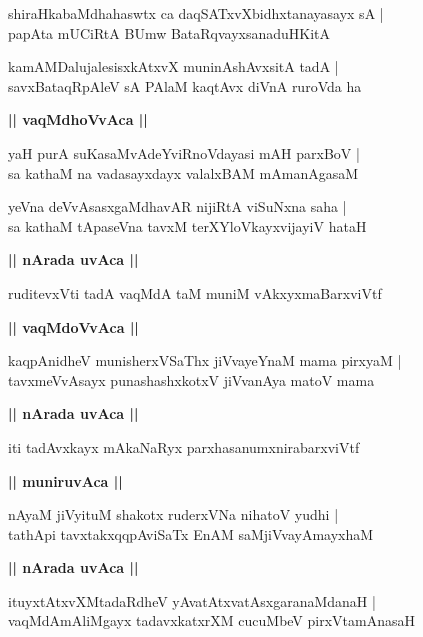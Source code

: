 \documentclass[twoside,12pt,openright]{book}
\newcounter{shloka}[chapter]
\def\uvaca#1{\centerline{{\large\textbf{#1}}}}
\begin{document}
\begin{shloka}%
shiraHkabaMdhahaswtx ca daqSATxvXbidhxtanayasayx sA |\\
papAta mUCiRtA BUmw BataRqvayxsanaduHKitA 
\end{shloka}

\begin{shloka}%
kamAMDalujalesisxkAtxvX muninAshAvxsitA tadA |\\
savxBataqRpAleV sA PAlaM kaqtAvx diVnA ruroVda ha 
\end{shloka}

\uvaca{|| vaqMdhoVvAca ||}

\begin{shloka}%
yaH purA suKasaMvAdeYviRnoVdayasi mAH parxBoV |\\
sa kathaM na vadasayxdayx valalxBAM mAmanAgasaM 
\end{shloka}

\begin{shloka}%
yeVna deVvAsasxgaMdhavAR nijiRtA viSuNxna saha |\\
sa kathaM tApaseVna tavxM terXYloVkayxvijayiV hataH 
\end{shloka}

\uvaca{|| nArada uvAca ||}

\begin{shloka}%
ruditevxVti tadA vaqMdA taM muniM vAkxyxmaBarxviVtf 
\end{shloka}

\uvaca{|| vaqMdoVvAca ||}

\begin{shloka}%
kaqpAnidheV munisherxVSaThx jiVvayeYnaM mama pirxyaM |\\
tavxmeVvAsayx punashashxkotxV jiVvanAya matoV mama
\end{shloka}

\uvaca{|| nArada uvAca ||}

\begin{shloka}%
iti tadAvxkayx mAkaNaRyx parxhasanumxnirabarxviVtf 
\end{shloka}

\uvaca{|| muniruvAca ||}

\begin{shloka}%
nAyaM jiVyituM shakotx ruderxVNa nihatoV yudhi |\\
tathApi tavxtakxqqpAviSaTx EnAM saMjiVvayAmayxhaM 
\end{shloka}

\uvaca{|| nArada uvAca ||}

\begin{shloka}%
ituyxtAtxvXMtadaRdheV yAvatAtxvatAsxgaranaMdanaH |\\
vaqMdAmAliMgayx tadavxkatxrXM cucuMbeV pirxVtamAnasaH 
\end{shloka}
\end{document}
